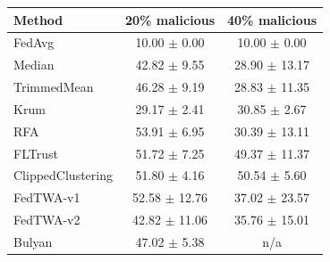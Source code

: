 \begin{tabular}{lcc}
\toprule
Method & 20\% malicious & 40\% malicious \\
\midrule
FedAvg & 10.00 $\pm$ 0.00 & 10.00 $\pm$ 0.00 \\
Median & 42.82 $\pm$ 9.55 & 28.90 $\pm$ 13.17 \\
TrimmedMean & 46.28 $\pm$ 9.19 & 28.83 $\pm$ 11.35 \\
Krum & 29.17 $\pm$ 2.41 & 30.85 $\pm$ 2.67 \\
RFA & 53.91 $\pm$ 6.95 & 30.39 $\pm$ 13.11 \\
FLTrust & 51.72 $\pm$ 7.25 & 49.37 $\pm$ 11.37 \\
ClippedClustering & 51.80 $\pm$ 4.16 & 50.54 $\pm$ 5.60 \\
FedTWA-v1 & 52.58 $\pm$ 12.76 & 37.02 $\pm$ 23.57 \\
FedTWA-v2 & 42.82 $\pm$ 11.06 & 35.76 $\pm$ 15.01 \\
Bulyan & 47.02 $\pm$ 5.38 & n/a \\
\bottomrule
\end{tabular}